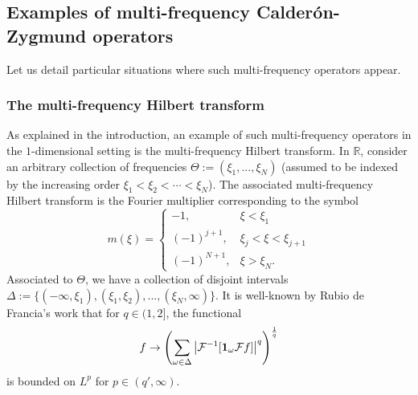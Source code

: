 \documentclass[11pt]{amsart}
\theoremstyle{remark}
\newtheorem{dfn}{Definition}[section]
\newcommand{\R}{{\mathbb R}}
\begin{document}


\subsection{Examples of multi-frequency Calder\'on-Zygmund operators}


Let us detail particular situations where such multi-frequency operators appear.


\subsubsection*{The multi-frequency Hilbert transform}

As explained in the introduction, an example of such multi-frequency operators in the $1$-dimensional setting is the multi-frequency Hilbert transform. In $\R$, consider an arbitrary collection of frequencies $\Theta:=(\xi_1,...,\xi_N)$ (assumed to be indexed by the increasing order $\xi_1< \xi_2< \cdots < \xi_N$). The associated multi-frequency Hilbert transform is the Fourier multiplier corresponding to the symbol
$$ m(\xi) = \left\{ \begin{array}{ll}
                     -1, & \xi<\xi_1 \\
                      (-1)^{j+1}, & \xi_j<\xi<\xi_{j+1} \\
                      (-1)^{N+1}, & \xi>\xi_N.
                    \end{array} \right. $$
Associated to $\Theta$, we have a collection of disjoint intervals $\Delta:=\{ (-\infty,\xi_1), (\xi_1,\xi_2),...,(\xi_N,\infty)\}$. It is well-known by Rubio de Francia's work \cite{Rubio} that for $q\in(1,2]$, the functional 
\begin{equation} f \rightarrow \left( \sum_{\omega\in\Delta} \left|{\mathcal F}^{-1}[{\bf 1}_{\omega} {\mathcal F}f]\right|^q \right)^{\frac{1}{q}} \label{eq:f} \end{equation}
is bounded on $L^p$ for $p\in(q',\infty)$. 
\end{document}
